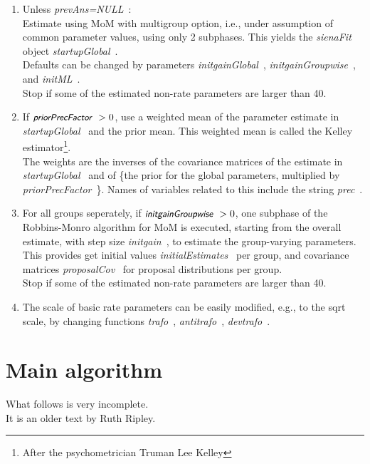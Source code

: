 \documentclass[a4paper,12pt,fleqn]{article}
\newcommand{\nnm}[1]{\textsf{\small\textit{#1}\ }}
\begin{document}
\begin{enumerate}
\item Unless \nnm{prevAns=NULL}:\\
     Estimate using MoM with multigroup option, i.e., under assumption
    of common parameter values, using only 2 subphases.
    This yields the \nnm{sienaFit} object \nnm{startupGlobal}.\\
    Defaults can be changed by parameters
    \nnm{initgainGlobal}, \nnm{initgainGroupwise}, and
    \nnm{initML}. \\
    Stop if some of the estimated non-rate parameters are larger than 40.
\item If $ \nnm{priorPrecFactor} > 0$, use a weighted mean of the parameter estimate
    in  \nnm{startupGlobal} and the prior mean.
    This weighted mean is called the Kelley estimator\footnote{After
    the psychometrician Truman Lee Kelley}. \\
    The weights are the inverses of the covariance matrices
    of the estimate in \nnm{startupGlobal} and of \{the prior
    for the global parameters, multiplied by \nnm{priorPrecFactor}\}.
    Names of variables related to this include the string \nnm{prec}.
\item
  For all groups seperately, if $\nnm{initgainGroupwise} > 0$,
  one subphase of the Robbins-Monro algorithm for MoM is executed,
  starting from the overall estimate, with step size \nnm{initgain},
  to estimate the group-varying parameters.\\
 This provides get initial values \nnm{initialEstimates} per group,
    and covariance matrices \nnm{proposalCov} for proposal distributions
    per group.\\
    Stop if some of the estimated non-rate parameters are larger than 40.
\item The scale of basic rate parameters can be easily modified,
   e.g., to the sqrt scale,
    by changing functions \nnm{trafo}, \nnm{antitrafo}, \nnm{devtrafo}.
\end{enumerate}



\section{Main algorithm}

What follows is very incomplete.\\
It is an older text by Ruth Ripley.
\bigskip
\end{document}

